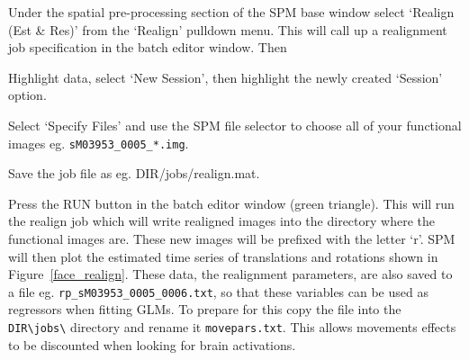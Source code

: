 Under the spatial pre-processing section of the SPM base window select `Realign (Est & Res)' from the `Realign' pulldown menu. This will call up a realignment job specification 
in the batch editor window.
Then
\bi
\item{Highlight data, select `New Session', then highlight the newly created `Session' option.} 
\item{Select `Specify Files' and use the SPM file selector
to choose all of your functional images eg. \verb!sM03953_0005_*.img!.}
\item{Save the job file as eg. {\sf DIR/jobs/realign.mat}}.
\item{Press the RUN button in the batch editor window (green triangle).}
\ei
This 
will run the realign job which will write realigned images into the directory where the functional images
are. These new images will be prefixed with the letter `r'. SPM will then plot the estimated time series of translations and rotations shown in Figure~\ref{face_realign}. These data, the realignment parameters, are also saved to 
a file eg. \verb!rp_sM03953_0005_0006.txt!, so that these variables can be used as regressors when fitting GLMs. To prepare for this copy the file into the 
\verb!DIR\jobs\! directory and rename it \verb!movepars.txt!.
This allows movements effects to be discounted when
looking for brain activations.

